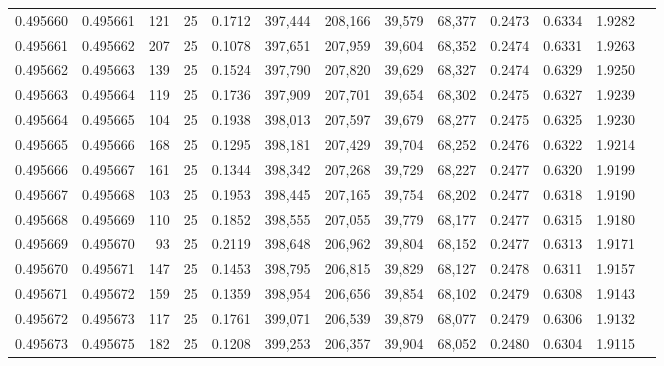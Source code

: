 \begin{tabular}{rrrrrrrrrrrrr}
0.495660 & 0.495661 &   121 &  25 &                                     0.1712 & 397,444 & 208,166 &  39,579 &  68,377 & 0.2473 & 0.6334 & 1.9282 \\
0.495661 & 0.495662 &   207 &  25 &                                     0.1078 & 397,651 & 207,959 &  39,604 &  68,352 & 0.2474 & 0.6331 & 1.9263 \\
0.495662 & 0.495663 &   139 &  25 &                                     0.1524 & 397,790 & 207,820 &  39,629 &  68,327 & 0.2474 & 0.6329 & 1.9250 \\
0.495663 & 0.495664 &   119 &  25 &                                     0.1736 & 397,909 & 207,701 &  39,654 &  68,302 & 0.2475 & 0.6327 & 1.9239 \\
0.495664 & 0.495665 &   104 &  25 &                                     0.1938 & 398,013 & 207,597 &  39,679 &  68,277 & 0.2475 & 0.6325 & 1.9230 \\
0.495665 & 0.495666 &   168 &  25 &                                     0.1295 & 398,181 & 207,429 &  39,704 &  68,252 & 0.2476 & 0.6322 & 1.9214 \\
0.495666 & 0.495667 &   161 &  25 &                                     0.1344 & 398,342 & 207,268 &  39,729 &  68,227 & 0.2477 & 0.6320 & 1.9199 \\
0.495667 & 0.495668 &   103 &  25 &                                     0.1953 & 398,445 & 207,165 &  39,754 &  68,202 & 0.2477 & 0.6318 & 1.9190 \\
0.495668 & 0.495669 &   110 &  25 &                                     0.1852 & 398,555 & 207,055 &  39,779 &  68,177 & 0.2477 & 0.6315 & 1.9180 \\
0.495669 & 0.495670 &    93 &  25 &                                     0.2119 & 398,648 & 206,962 &  39,804 &  68,152 & 0.2477 & 0.6313 & 1.9171 \\
0.495670 & 0.495671 &   147 &  25 &                                     0.1453 & 398,795 & 206,815 &  39,829 &  68,127 & 0.2478 & 0.6311 & 1.9157 \\
0.495671 & 0.495672 &   159 &  25 &                                     0.1359 & 398,954 & 206,656 &  39,854 &  68,102 & 0.2479 & 0.6308 & 1.9143 \\
0.495672 & 0.495673 &   117 &  25 &                                     0.1761 & 399,071 & 206,539 &  39,879 &  68,077 & 0.2479 & 0.6306 & 1.9132 \\
0.495673 & 0.495675 &   182 &  25 &                                     0.1208 & 399,253 & 206,357 &  39,904 &  68,052 & 0.2480 & 0.6304 & 1.9115 \\

\end{tabular}
